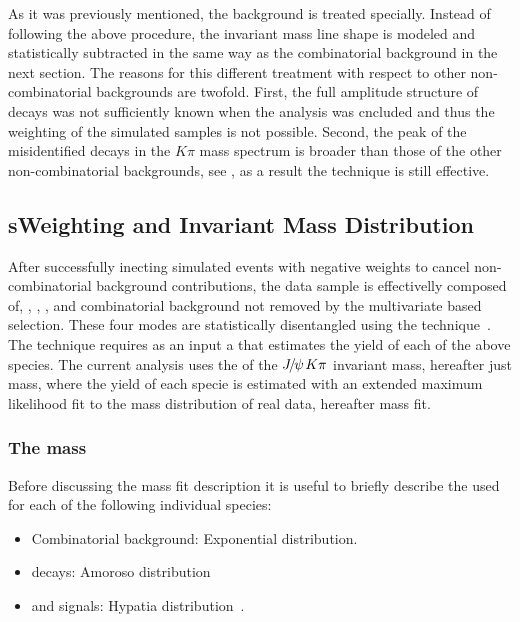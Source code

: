 As it was previously mentioned, the \LbJpsippi background is treated specially. Instead of following the above
procedure, the \LbJpsippi invariant mass line shape is modeled and statistically subtracted in the same way as the
combinatorial background in the next section. The reasons for this different treatment with respect to other
non-combinatorial backgrounds are twofold. First, the full amplitude structure of \LbJpsippi decays was not
sufficiently known when the analysis was cncluded and thus the weighting of the simulated samples is not possible.
Second, the peak of the misidentified \LbJpsippi decays in the \jpsi$K\pi$ mass spectrum is broader than those
of the other non-combinatorial backgrounds, see , as a result the \sPlot technique is still
effective.


\subsection{sWeighting and Invariant Mass Distribution}
\label{sWeighting_and_mass}

After successfully inecting simulated events with negative weights to cancel non-combinatorial background contributions,
the data sample is effectivelly composed of, \BdJpsiKpi, \BsJpsiKpi, \LbJpsippi, and combinatorial background not removed by the
multivariate based selection. These four modes are statistically disentangled using the \sPlot technique~\cite{splot}.
The technique requires as an input a \pdf that estimates the yield of each
of the above species. The current analysis uses the \pdf of the ${J\mskip -3mu/\mskip -2mu\psi\mskip 2mu} K\pi$ invariant mass, hereafter just mass, where the yield of each specie
is estimated with an extended maximum likelihood fit to the mass distribution of real data, hereafter mass fit.

\subsubsection{The mass \pdf}
Before discussing the mass fit description it is useful to briefly describe the \pdfs used for each of the following individual species:

\begin{itemize}
\item Combinatorial background: Exponential distribution.
\item \LbJpsippi decays: Amoroso distribution~\cite{Amoroso}
\item \Bd and \Bs signals: Hypatia distribution~\cite{Santos:2013gra}.
\end{itemize}

